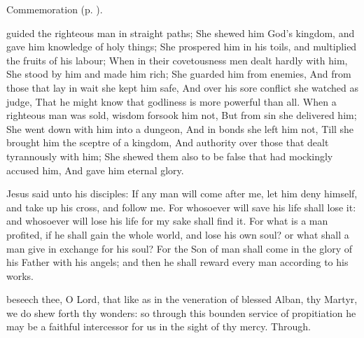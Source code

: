 \begin{rubric}
	Commemoration  (p. \pageref{PaulinusCollect}).
\end{rubric}

 guided the righteous man in straight paths; She shewed him God’s kingdom, and gave him knowledge of holy things; She prospered him in his toils, and multiplied the fruits of his labour; When in their covetousness men dealt hardly with him, She stood by him and made him rich; She guarded him from enemies, And from those that lay in wait she kept him safe, And over his sore conflict she watched as judge, That he might know that godliness is more powerful than all. When a righteous man was sold, wisdom forsook him not, But from sin she delivered him; She went down with him into a dungeon, And in bonds she left him not, Till she brought him the sceptre of a kingdom, And authority over those that dealt tyrannously with him; She shewed them also to be false that had mockingly accused him, And gave him eternal glory.


\clearpage
\alleluianotice
{}

 Jesus said unto his disciples: If any man will come after me, let him deny himself, and take up his cross, and follow me. For whosoever will save his life shall lose it: and whosoever will lose his life for my sake shall find it. For what is a man profited, if he shall gain the whole world, and lose his own soul? or what shall a man give in exchange for his soul? For the Son of man shall come in the glory of his Father with his angels; and then he shall reward every man according to his works.


\secret
{} beseech thee, O Lord, that like as in the veneration of blessed Alban, thy Martyr, we do shew forth thy wonders: so through this bounden service of propitiation he may be a faithful intercessor for us in the sight of thy mercy. Through.

